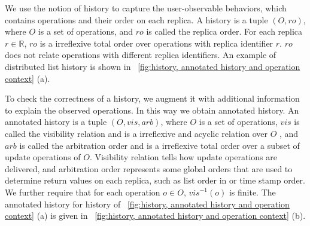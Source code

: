 {\color {red}We use the notion of history to capture the user-observable behaviors, which contains operations and their order on each replica.} A history is a tuple $(O,\mathit{ro})$, where $O$ is a set of operations, and $\mathit{ro}$ is called the replica order. For each replica $r \in \mathbb{R}$, $\mathit{ro}$ is a irreflexive total order over operations with replica identifier $r$. $\mathit{ro}$ does not relate operations with different replica identifiers. %
{\color {red}An example of distributed list history is shown in \figurename~\ref{fig:history, annotated history and operation context} (a).}

{\color{red}To check the correctness of a history, we augment it with additional information to explain the observed operations. In this way we obtain annotated history.} An annotated history is a tuple $(O,\mathit{vis},\mathit{arb})$, where $O$ is a set of operations, $\mathit{vis}$ is called the visibility relation and is a irreflexive and acyclic relation over $O$ , and $\mathit{arb}$ is called the arbitration order and is a irreflexive total order over a subset of update operations of $O$. {\color {red} Visibility relation tells how update operations are delivered, and arbitration order represents some global orders that are used to determine return values on each replica, such as list order in \cite{Attiya:2016} or time stamp order.} We further require that for each operation $o \in O$, $\mathit{vis}^{-1}(o)$ is finite. {\color {red}The annotated history for history of \figurename~\ref{fig:history, annotated history and operation context} (a) is given in \figurename~\ref{fig:history, annotated history and operation context} (b).} %





